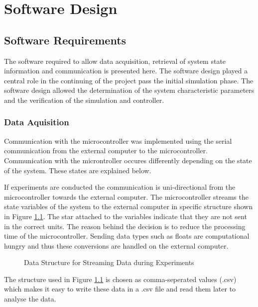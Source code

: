 \chapter{Software Design}
\label{chp5:software}
\section{Software Requirements}
\label{sec:software_requirements}
The software required to allow data acquisition, retrieval of system state information and communication is presented here. The software design played a central role in the continuing of the project pass the initial simulation phase. The software design allowed the determination of the system characteristic parameters and the verification of the simulation and controller.

\subsection{Data Aquisition}
Communication with the microcontroller was implemented using the serial communication from the external computer to the microcontroller. Communication with the microntroller occures differently depending on the state of the system. These states are explained below.

If experiments are conducted the communication is uni-directional from the microcontroller towards the external computer. The microcontroller streams the state variables of the system to the external computer in specific structure shown in Figure \ref{fig:data_struct}. The star attached to the variables indicate that they are not sent in the correct units. The reason behind the decision is to reduce the processing time of the microcontroller. Sending data types such as floats are computational hungry and thus these conversions are handled on the external computer.

\begin{figure}[h]
	\centering
	
	\caption{Data Structure for Streaming Data during Experiments}
	\label{fig:data_struct}
\end{figure}

The structure used in Figure \ref{fig:data_struct} is chosen as comma-seperated values (.csv) which makes it easy to write these data in a .csv file and read them later to analyse the data.\\

